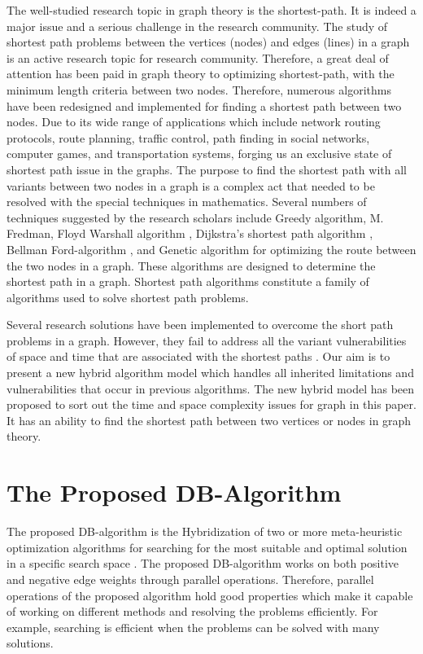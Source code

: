 \documentclass[10pt]{NSP1}
\begin{document}
	The well-studied research topic in graph theory is the shortest-path. It is indeed a major issue and a serious challenge in the research community. The study of shortest path problems between the vertices (nodes) and edges (lines) in a graph is an active research topic for research community. Therefore, a great deal of attention has been paid in graph theory to optimizing shortest-path, with the minimum length criteria between two nodes. Therefore, numerous algorithms have been redesigned and implemented for finding a shortest path between two nodes. Due to its wide range of applications which include network routing protocols, route planning, traffic control, path finding in social networks, computer games, and transportation systems, forging us an exclusive state of shortest path issue in the graphs. The purpose to find the shortest path with all variants between two nodes in a graph is a complex act that needed to be resolved with the special techniques in mathematics. Several numbers of techniques suggested by the research scholars include Greedy algorithm, M. Fredman, Floyd Warshall algorithm \cite{Bellman1957,Bellman1958}, Dijkstra's shortest path algorithm \cite{Fredman1976,Floyd1962}, Bellman Ford-algorithm \cite{Warshall1962,Kim2022}, and Genetic algorithm for optimizing the route between the two nodes in a graph. These algorithms are designed to determine the shortest path in a graph. Shortest path algorithms constitute a family of algorithms used to solve shortest path problems.

	Several research solutions have been implemented to overcome the short path problems in a graph. However, they fail to address all the variant vulnerabilities of space and time that are associated with the shortest paths \cite{Coy2022,Gajjar2024}. Our aim is to present a new hybrid algorithm model which handles all inherited limitations and vulnerabilities that occur in previous algorithms. The new hybrid model has been proposed to sort out the time and space complexity issues for graph in this paper. It has an ability to find the shortest path between two vertices or nodes in graph theory.
	
	\section{The Proposed DB-Algorithm}
	
	The proposed DB-algorithm is the Hybridization of  two or more meta-heuristic optimization algorithms for searching for the most suitable and optimal solution in a specific search space \cite{Kim2025,Andreoletti2025}. The proposed DB-algorithm works on both positive and negative edge weights through parallel operations. Therefore, parallel operations of the proposed algorithm hold good properties which make it capable of working on different methods and resolving the problems efficiently. For example, searching is efficient when the problems can be solved with many solutions.
\end{document}
